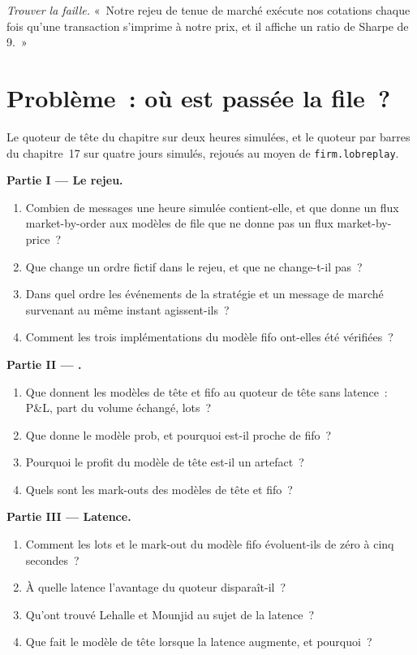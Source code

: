 \begin{exercise}[$\star\star\star$]\label{exo:rs:order-book-replay-simulation:8}
\emph{Trouver la faille.} «~Notre rejeu de tenue de marché exécute nos cotations chaque fois qu'une transaction s'imprime à notre prix, et il affiche un ratio de Sharpe de 9.~»
\end{exercise}

\section{Problème~: où est passée la file~?}

\begin{problem}\label{pb:rs:order-book-replay-simulation:1}
Le quoteur de tête du chapitre sur deux heures simulées, et le quoteur par barres du chapitre~17 sur quatre jours simulés, rejoués au moyen de \texttt{firm.lobreplay}.

\medskip\noindent\textbf{Partie I --- Le rejeu.}
\begin{enumerate}
\item Combien de messages une heure simulée contient-elle, et que donne un flux market-by-order aux modèles de file que ne donne pas un flux market-by-price~?
\item Que change un ordre fictif dans le rejeu, et que ne change-t-il pas~?
\item Dans quel ordre les événements de la stratégie et un message de marché survenant au même instant agissent-ils~?
\item Comment les trois implémentations du modèle fifo ont-elles été vérifiées~?
\end{enumerate}

\medskip\noindent\textbf{Partie II --- .}
\begin{enumerate}[resume]
\item Que donnent les modèles de tête et fifo au quoteur de tête sans latence~: P\&L, part du volume échangé, lots~?
\item Que donne le modèle prob, et pourquoi est-il proche de fifo~?
\item Pourquoi le profit du modèle de tête est-il un artefact~?
\item Quels sont les mark-outs des modèles de tête et fifo~?
\end{enumerate}

\medskip\noindent\textbf{Partie III --- Latence.}
\begin{enumerate}[resume]
\item Comment les lots et le mark-out du modèle fifo évoluent-ils de zéro à cinq secondes~?
\item À quelle latence l'avantage du quoteur disparaît-il~?
\item Qu'ont trouvé Lehalle et Mounjid au sujet de la latence~?
\item Que fait le modèle de tête lorsque la latence augmente, et pourquoi~?
\end{enumerate}


\end{problem}
